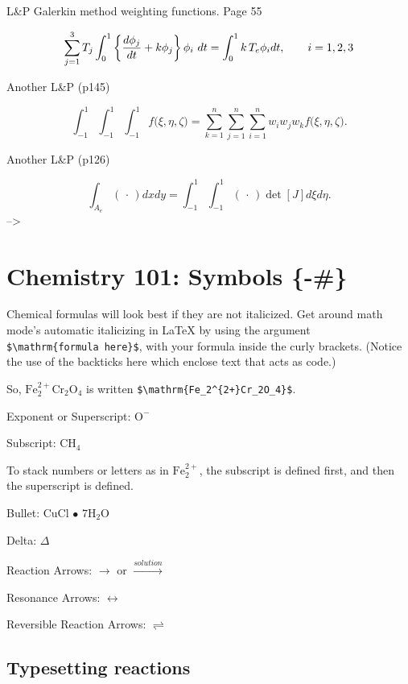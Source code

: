 \documentclass[ms]{uncgdissertationexp}
\theoremstyle{plain}
\theoremstyle{definition}
\theoremstyle{remark}
\begin{document}
  L\&P Galerkin method weighting functions. Page 55
  
  \[
  \sum_{j=1}^3 T_j\int_0^1\left\{{d\phi_j\over dt} + k\phi_j\right\} \phi_i\ dt
     = \int_{0}^1k\,T_e\phi_idt, \qquad i=1,2,3 \]
  
  Another L\&P (p145)
  
  \[
  \int_{-1}^1\!\int_{-1}^1\!\int_{-1}^1 f\big(\xi,\eta,\zeta\big)
     = \sum_{k=1}^n\sum_{j=1}^n\sum_{i=1}^n w_i w_j w_k f\big( \xi,\eta,\zeta\big).
  \]
  
  Another L\&P (p126)
  
  \[
  \int_{A_e} (\,\cdot\,) dx dy = \int_{-1}^1\!\int_{-1}^1 (\,\cdot\,) \det[J] d\xi d\eta.
  \] --\textgreater{}
  
  \section{Chemistry 101: Symbols \{-\#\}}\label{chemistry-101-symbols--}
  
  Chemical formulas will look best if they are not italicized. Get around
  math mode's automatic italicizing in LaTeX by using the argument
  \texttt{\$\textbackslash{}mathrm\{formula\ here\}\$}, with your formula
  inside the curly brackets. (Notice the use of the backticks here which
  enclose text that acts as code.)
  
  So, \(\mathrm{Fe_2^{2+}Cr_2O_4}\) is written
  \texttt{\$\textbackslash{}mathrm\{Fe\_2\^{}\{2+\}Cr\_2O\_4\}\$}.
  
  \noindent Exponent or Superscript: \(\mathrm{O^-}\)
  
  \noindent Subscript: \(\mathrm{CH_4}\)
  
  To stack numbers or letters as in \(\mathrm{Fe_2^{2+}}\), the subscript
  is defined first, and then the superscript is defined.
  
  \noindent Bullet: CuCl \(\bullet\) \(\mathrm{7H_{2}O}\)
  
  \noindent Delta: \(\Delta\)
  
  \noindent Reaction Arrows: \(\longrightarrow\) or
  \(\xrightarrow{solution}\)
  
  \noindent Resonance Arrows: \(\leftrightarrow\)
  
  \noindent Reversible Reaction Arrows: \(\rightleftharpoons\)
  
  \subsection{Typesetting reactions}\label{typesetting-reactions}
  
\end{document}
